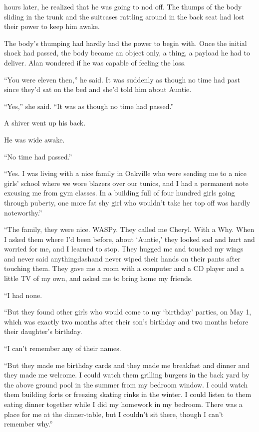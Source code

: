  hours later, he realized that he was going to nod off.  The thumps
of the body sliding in the trunk and the suitcases rattling around in
the back seat had lost their power to keep him awake.

The body's thumping had hardly had the power to begin with.  Once the
initial shock had passed, the body became an object only, a thing, a
payload he had to deliver.  Alan wondered if he was capable of feeling
the loss.

``You were eleven then,'' he said.  It was suddenly as though no time
had past since they'd sat on the bed and she'd told him about Auntie.

``Yes,'' she said.  ``It was as though no time had passed.''

A shiver went up his back.

He was wide awake.

``No time had passed.''

``Yes.  I was living with a nice family in Oakville who were sending
me to a nice girls' school where we wore blazers over our tunics, and
I had a permanent note excusing me from gym classes.  In a building
full of four hundred girls going through puberty, one more fat shy
girl who wouldn't take her top off was hardly noteworthy.''

``The family, they were nice.  WASPy.  They called me Cheryl.  With a
Why.  When I asked them where I'd been before, about `Auntie,' they
looked sad and hurt and worried for me, and I learned to stop.  They
hugged me and touched my wings and never said anythingdash{}and never
wiped their hands on their pants after touching them.  They gave me a
room with a computer and a CD player and a little TV of my own, and
asked me to bring home my friends.

``I had none.

``But they found other girls who would come to my `birthday' parties,
on May 1, which was exactly two months after their son's birthday and
two months before their daughter's birthday.

``I can't remember any of their names.

``But they made me birthday cards and they made me breakfast and
dinner and they made me welcome.  I could watch them grilling burgers
in the back yard by the above ground pool in the summer from my
bedroom window.  I could watch them building forts or freezing skating
rinks in the winter.  I could listen to them eating dinner together
while I did my homework in my bedroom.  There was a place for me at
the dinner-table, but I couldn't sit there, though I can't remember
why.''


